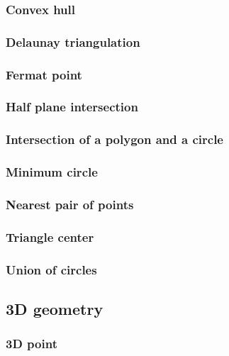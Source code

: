 \documentclass[titlepage,a4paper,10pt]{article}
\begin{document}
\begin{multicols}{2}
\begin{spacing}{0.8}
{				\subsubsection{Convex hull}
					
				\subsubsection{Delaunay triangulation}
					
				\subsubsection{Fermat point}
					
				\subsubsection{Half plane intersection}
					
				\subsubsection{Intersection of a polygon and a circle}
					
				\subsubsection{Minimum circle}
					
				\subsubsection{Nearest pair of points}
					
				\subsubsection{Triangle center}
					
				\subsubsection{Union of circles}
					
			\subsection{3D geometry}
				\subsubsection{3D point}
					
}
\end{spacing}
\end{multicols}
\end{document}
